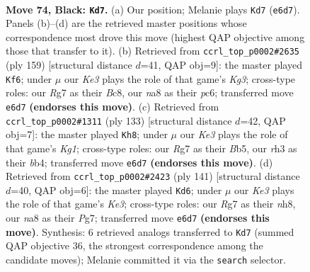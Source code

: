 \documentclass[11pt]{article}
\begin{document}
\clearpage

\begin{figure}[p]\centering
\begin{subfigure}{0.46\textwidth}\centering
\resizebox{\linewidth}{!}{%
\newchessgame
\chessboard[
  setfen={N7/p5r1/P1p1k1p1/2P2p1p/bP3P1P/7R/5K2/8 b - - 4 74},
  showmover=false,
  pgfstyle=straightmove, color=movearrow, markmove={e6-d7}
]}
\caption{}
\end{subfigure}\hfill
\begin{subfigure}{0.46\textwidth}\centering
\resizebox{\linewidth}{!}{%
\newchessgame
\chessboard[
  setfen={2b5/8/2P1p1k1/1p1p1p2/1P1P1P2/pB2P2P/8/7K b - - 17 80},
  showmover=false,
  pgfstyle=straightmove, color=movearrow, markmove={g6-f6}
]}
\caption{}
\end{subfigure}
\\[4pt]
\begin{subfigure}{0.46\textwidth}\centering
\resizebox{\linewidth}{!}{%
\newchessgame
\chessboard[
  setfen={6k1/6p1/5p1p/1b5P/pB3PP1/Pp6/1P3K2/8 b - - 0 67},
  showmover=false,
  pgfstyle=straightmove, color=movearrow, markmove={g8-h8}
]}
\caption{}
\end{subfigure}\hfill
\begin{subfigure}{0.46\textwidth}\centering
\resizebox{\linewidth}{!}{%
\newchessgame
\chessboard[
  setfen={7N/6p1/2p1kp2/p3p1pP/Pb2P1P1/3K1P2/8/8 b - - 10 71},
  showmover=false,
  pgfstyle=straightmove, color=movearrow, markmove={e6-d6}
]}
\caption{}
\end{subfigure}
\caption{\textbf{Move 74, Black: \texttt{Kd7}.} (a) Our position; Melanie plays \texttt{Kd7} (\texttt{e6d7}). Panels (b)--(d) are the retrieved master positions whose correspondence most drove this move (highest QAP objective among those that transfer to it). (b) Retrieved from \texttt{ccrl\_top\_p0002\#2635} (ply 159) [structural distance $d$=41, QAP obj=9]: the master played \texttt{Kf6}; under $\mu$ our \emph{Ke3} plays the role of that game's \emph{Kg3}; cross-type roles: our \emph{R}g7 as their \emph{B}c8, our \emph{n}a8 as their \emph{p}c6; transferred move \texttt{e6d7} \textbf{(endorses this move)}. (c) Retrieved from \texttt{ccrl\_top\_p0002\#1311} (ply 133) [structural distance $d$=42, QAP obj=7]: the master played \texttt{Kh8}; under $\mu$ our \emph{Ke3} plays the role of that game's \emph{Kg1}; cross-type roles: our \emph{R}g7 as their \emph{B}b5, our \emph{r}h3 as their \emph{b}b4; transferred move \texttt{e6d7} \textbf{(endorses this move)}. (d) Retrieved from \texttt{ccrl\_top\_p0002\#2423} (ply 141) [structural distance $d$=40, QAP obj=6]: the master played \texttt{Kd6}; under $\mu$ our \emph{Ke3} plays the role of that game's \emph{Ke3}; cross-type roles: our \emph{R}g7 as their \emph{n}h8, our \emph{n}a8 as their \emph{P}g7; transferred move \texttt{e6d7} \textbf{(endorses this move)}. Synthesis: 6 retrieved analogs transferred to \texttt{Kd7} (summed QAP objective 36, the strongest correspondence among the candidate moves); Melanie committed it via the \texttt{search} selector.}
\label{fig:thought-m147}
\end{figure}
\end{document}
